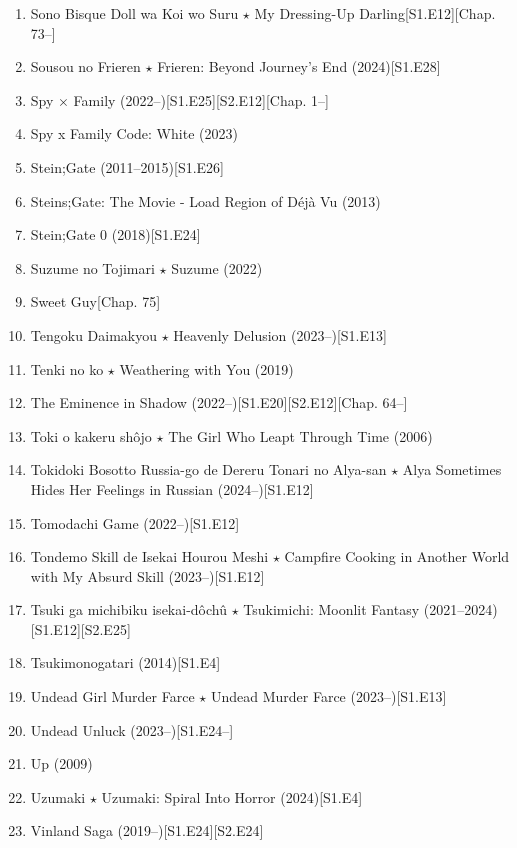 \documentclass{article}
\begin{document}
\begin{enumerate}
    \item Sono Bisque Doll wa Koi wo Suru $\star$ My Dressing-Up Darling\hfill[S1.E12][Chap. 73--]
    \item {\sc Sousou no Frieren $\star$ Frieren: Beyond Journey's End} (2024)\hfill[S1.E28]
    \item {\sc Spy $\times$ Family} (2022--)\hfill[S1.E25][S2.E12][Chap. 1--]
    \item {\sc Spy x Family Code: White} (2023)
    \item {\sc Stein;Gate} (2011--2015)\hfill[S1.E26]
    \item {\sc Steins;Gate: The Movie - Load Region of Déjà Vu} (2013)
    \item {\sc Stein;Gate 0} (2018)\hfill[S1.E24]
    \item {\sc Suzume no Tojimari $\star$ Suzume} (2022)
    \item {\sc Sweet Guy}\hfill[Chap. 75]
    \item Tengoku Daimakyou $\star$ Heavenly Delusion (2023--)\hfill[S1.E13]
    \item {\sc Tenki no ko $\star$ Weathering with You} (2019)
    \item The Eminence in Shadow (2022--)\hfill[S1.E20][S2.E12][Chap. 64--]
    \item {\sc Toki o kakeru sh\^ojo $\star$ The Girl Who Leapt Through Time} (2006)
    \item {\sc Tokidoki Bosotto Russia-go de Dereru Tonari no Alya-san $\star$ Alya Sometimes Hides Her Feelings in Russian} (2024--)\hfill[S1.E12]
    \item {\sc Tomodachi Game} (2022--)\hfill[S1.E12]
    \item Tondemo Skill de Isekai Hourou Meshi $\star$ Campfire Cooking in Another World with My Absurd Skill (2023--)\hfill[S1.E12]
    \item {\sc Tsuki ga michibiku isekai-dôchû $\star$ Tsukimichi: Moonlit Fantasy} (2021--2024)\hfill[S1.E12][S2.E25]
    \item {\sc Tsukimonogatari} (2014)\hfill[S1.E4]
    \item {\sc Undead Girl Murder Farce $\star$ Undead Murder Farce} (2023--)\hfill[S1.E13]
    \item Undead Unluck (2023--)\hfill[S1.E24--]
    \item {\sc Up} (2009)
    \item {\sc Uzumaki $\star$ Uzumaki: Spiral Into Horror} (2024)\hfill[S1.E4]
    \item {\sc Vinland Saga} (2019--)\hfill[S1.E24][S2.E24]

\end{enumerate}
\end{document}
